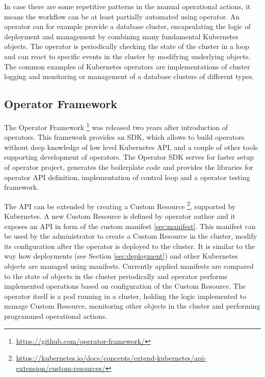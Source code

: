 \documentclass[
  digital, %
  twoside, %
  table,   %
  lof,     %
  lot,     %
]{fithesis3}
\begin{document}
In case there are some repetitive patterns in the manual operational actions, it means the workflow can be at least partially automated using operator. An operator can for example provide a database cluster, encapsulating the logic of deployment and management by combining many fundamental Kubernetes objects. The operator is periodically checking the state of the cluster in a loop and can react to specific events in the cluster by modifying underlying objects. The common examples of Kubernetes operators are implementations of cluster logging and monitoring or management of a database clusters of different types.

\subsection{Operator Framework} \label{sec:operator_framework}
The Operator Framework \footnote{\url{https://github.com/operator-framework/}} was released two years after introduction of operators. This framework provides an SDK, which allows to build operators without deep knowledge of low level Kubernetes API, and a couple of other tools supporting development of operators. The Operator SDK serves for faster setup of operator project, generates the boilerplate code and provides the libraries for operator API definition, implementation of control loop and a operator testing framework.

The API can be extended by creating a Custom Resource \footnote{\url{https://kubernetes.io/docs/concepts/extend-kubernetes/api-extension/custom-resources/}}, supported by Kubernetes. A new Custom Resource is defined by operator author and it exposes an API in form of the custom manifest \ref{sec:manifest}. This manifest can be used by the administrator to create a Custom Resource in the cluster, modify its configuration after the operator is deployed to the cluster. It is similar to the way how deployments (see Section \ref{sec:deployment}) and other Kubernetes objects are managed using manifests. Currently applied manifests are compared to the state of objects in the cluster periodically and operator performs implemented operations based on configuration of the Custom Resource. The operator itself is a pod running in a cluster, holding the logic implemented to manage Custom Resource, monitoring other objects in the cluster and performing programmed operational actions.
\end{document}
